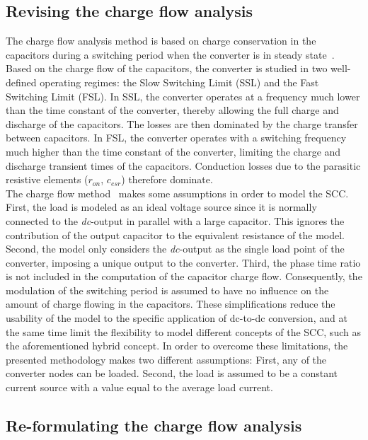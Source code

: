 \subsection{Revising the charge flow analysis}
The charge flow analysis method is based on charge conservation in the capacitors during a switching period when the converter is in steady state~\cite{95Makowski}. Based on the charge flow of the capacitors, the converter is studied in two well-defined operating regimes: the Slow Switching Limit (SSL) and the Fast Switching Limit (FSL). In SSL, the converter operates at a frequency much lower than the time constant of the converter, thereby allowing the full charge and discharge of the capacitors. The losses are then dominated by the charge transfer between capacitors. In FSL, the converter operates with a switching frequency much higher than the time constant of the converter, limiting the charge and discharge transient times of the capacitors. Conduction losses due to the parasitic resistive elements ($r_{on}$, $c_{esr}$) therefore dominate.\\

The charge flow method~\cite{95Makowski} makes some assumptions in order to model the SCC. First, the load is modeled as an ideal voltage source since it is normally connected to the \emph{dc}-output in parallel with a large capacitor. This ignores the contribution of the output capacitor to the equivalent resistance of the model. Second, the model only considers the \emph{dc}-output as the single load point of the converter, imposing a unique output to the converter. Third, the phase time ratio is not included in the computation of the capacitor charge flow. Consequently, the modulation of the switching period is assumed to have no influence on the amount of charge flowing in the capacitors. These simplifications reduce the usability of the model to the specific application of dc-to-dc conversion, and at the same time limit the flexibility to model different concepts of the SCC, such as the aforementioned hybrid concept. In order to overcome these limitations, the presented methodology makes two different assumptions: First, any of the converter nodes can be loaded. Second, the load is assumed to be a constant current source with a value equal to the average load current.\\


\subsection{Re-formulating the charge flow analysis}

